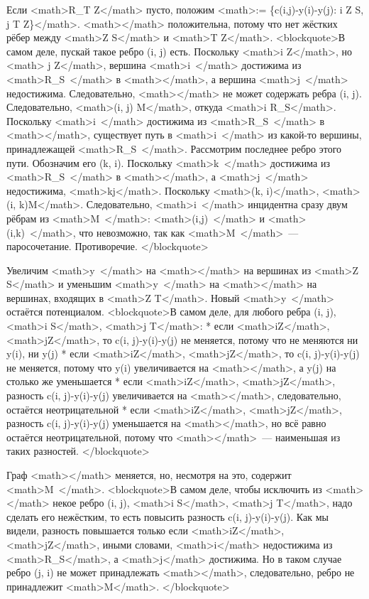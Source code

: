 \documentclass[discrete.tex]{subfiles}
\begin{document}
Если <math>R_T \cap Z</math> пусто, положим <math>\Delta := \min \{c(i,j)-y(i)-y(j): i \in Z \cap S, j \in T \setminus Z\}</math>. <math>\Delta</math> положительна, потому что нет жёстких рёбер между <math>Z \cap S</math> и <math>T \setminus Z</math>. <blockquote>В самом деле, пускай такое ребро (i, j) есть. Поскольку <math>i \in Z</math>, но <math> j \notin Z</math>, вершина <math>i\ </math> достижима из <math>R_S\ </math> в <math></math>, а вершина <math>j\ </math> недостижима.
Следовательно, <math></math> не может содержать ребра (i, j).
Следовательно, <math>(i, j) \in M</math>, откуда <math>i \notin R_S</math>.
Поскольку <math>i\ </math> достижима из <math>R_S\ </math> в <math></math>, существует путь в <math>i\ </math> из какой-то вершины, принадлежащей <math>R_S\ </math>.
Рассмотрим последнее ребро этого пути. Обозначим его (k, i).
Поскольку <math>k\ </math> достижима из <math>R_S\ </math> в <math></math>, а <math>j\ </math> недостижима, <math>k\neq j</math>.
Поскольку <math>(k, i)\in {}</math>, <math>(i, k)\in M</math>.
Следовательно, <math>i\ </math> инцидентна сразу двум рёбрам из <math>M\ </math>: <math>(i,j)\ </math> и <math>(i,k)\ </math>, что невозможно, так как <math>M\ </math> — паросочетание.
Противоречие.
</blockquote>

Увеличим <math>y\ </math> на <math>\Delta</math> на вершинах из <math>Z \cap S</math> и уменьшим <math>y\ </math> на <math>\Delta</math> на вершинах, входящих в <math>Z \cap T</math>. Новый <math>y\ </math> остаётся потенциалом. <blockquote>В самом деле, для любого ребра (i, j), <math>i \in S</math>, <math>j \in T</math>:
* если <math>i\notin Z</math>, <math>j\notin Z</math>, то c(i, j)-y(i)-y(j) не меняется, потому что не меняются ни y(i), ни y(j)
* если <math>i\in Z</math>, <math>j\in Z</math>, то c(i, j)-y(i)-y(j) не меняется, потому что y(i) увеличивается на <math>\Delta</math>, а y(j) на столько же уменьшается
* если <math>i\notin Z</math>, <math>j\in Z</math>, разность c(i, j)-y(i)-y(j) увеличивается на <math>\Delta</math>, следовательно, остаётся неотрицательной
* если <math>i\in Z</math>, <math>j\notin Z</math>, разность c(i, j)-y(i)-y(j) уменьшается на <math>\Delta</math>, но всё равно остаётся неотрицательной, потому что <math>\Delta</math> — наименьшая из таких разностей.
</blockquote>

Граф <math></math> меняется, но, несмотря на это, содержит <math>M\ </math>.
<blockquote>В самом деле, чтобы исключить из <math></math> некое ребро (i, j), <math>i \in S</math>, <math>j \in T</math>, надо сделать его нежёстким, то есть повысить разность c(i, j)-y(i)-y(j).
Как мы видели, разность повышается только если <math>i\notin Z</math>, <math>j\in Z</math>, иными словами, <math>i</math> недостижима из <math>R_S</math>, а <math>j</math> достижима. Но в таком случае ребро (j, i) не может принадлежать <math></math>, следовательно, ребро не принадлежит <math>M</math>. </blockquote>
\end{document}
